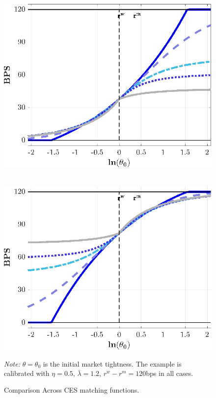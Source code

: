 \documentclass[12pt,american,english,notitlepage]{article}
\begin{document}
\begin{figure}[h!]
\vspace{10pt}

\begin{minipage}[b]{.45\linewidth}

 \\[4pt]

\includegraphics[width=1\linewidth]{NewCode/Figures/F_chip_comp.eps}
\end{minipage}
\hfill
\begin{minipage}[b]
{.45\linewidth}

  \\[4pt]

\includegraphics[width=1\linewidth]{NewCode/Figures/F_chim_comp.eps}
\end{minipage}
\caption{\label{fig:F_comparison}Comparison Across CES matching functions.
}

\parbox[b]{16cm}{\small \emph{Note:} $\theta=\theta_{0}$ is the initial market tightness. The example
is calibrated with $\eta=0.5$, $\bar{\lambda}=1.2$, $r^{w}-r^{m}=120$bps
in all cases.}
\end{figure}
\end{document}
